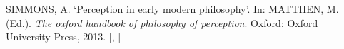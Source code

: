 \documentclass[
  12pt,
  a4paper,
  oneside,
  titlepage,
  toclink=all,
  toc=bibliography]{scrbook}
\newlength{\cslhangindent}
\newlength{\cslentryspacingunit} %
\newenvironment{CSLReferences}[2] %
 {%
  \setlength{\parindent}{0pt}
  \ifodd #1
  \let\oldpar\par
  \def\par{\hangindent=\cslhangindent\oldpar}
  \fi
  \setlength{\parskip}{#2\cslentryspacingunit}
 }%
 {}
\theoremstyle{definition}
\theoremstyle{definition}
\theoremstyle{plain}
\theoremstyle{definition}
\theoremstyle{plain}
\theoremstyle{plain}
\theoremstyle{plain}
\theoremstyle{plain}
\theoremstyle{remark}
\begin{document}
\begin{CSLReferences}{0}{1}
\leavevmode{}%
SIMMONS, A. {`Perception in early modern philosophy'}. In: MATTHEN, M.
(Ed.). \emph{The oxford handbook of philosophy of perception}. Oxford:
Oxford University Press, 2013.
{[},
\protect\hyperlink{cite_7}{\pageref{cite_7}}{]}

\end{CSLReferences}


\backmatter
\end{document}
